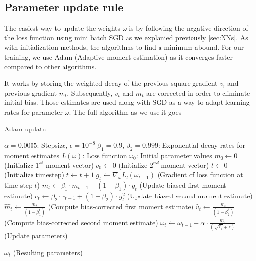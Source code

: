 \FloatBarrier

\subsection{Parameter update rule}     
The easiest way to update the weights $\omega$ is by following the negative direction of the loss function using mini batch SGD as we explanied previously \ref{sec:NNs}. As with initialization methods, the algorithms to find a minimum abound. For our training, we use Adam (Adaptive moment estimation) \cite{kingma2014adam} as it converges faster compared to other algorithms. \

It works by storing the weighted decay of the previous square gradient $v_t$ and previous gradient $m_t$. Subsequently, $v_t$ and $m_t$ are corrected in order to eliminate initial bias. Those estimates are used along with SGD as a way to adapt learning rates for parameter $\omega$. The full algorithm  as we use it goes     

\begin{algorithm}
\caption{Adam update}
\label{Adamalg}
\begin{algorithmic}[2]
    \Require $\alpha = 0.0005 $: Stepsize, $\epsilon = 10^{-8}$ 
    \Require $\beta_1 = 0.9$, $\beta_2 = 0.999$: Exponential decay rates for moment estimates
    \Require $L ( \omega ) $: Loss function
    \Require $ \omega_0 $: Initial parameter values
    \State $m_0 \leftarrow 0$ (Initialize $1^{st}$ moment vector)
    \State $v_0 \leftarrow 0$ (Initialize $2^{nd}$ moment vector)
    \State $t \leftarrow 0$ (Initialize timestep)
        \State $t \leftarrow t+1$ 
        \State $g_t \leftarrow \nabla_{\omega} L_t ( \omega_{t-1} )$ (Gradient of loss function at time step $t$)
        \State $m_t \leftarrow \beta_1 \cdot m_{t-1} + ( 1 -  \beta_1) \cdot g_t $ (Update biased first moment estimate)
        \State $v_t \leftarrow \beta_2 \cdot v_{t-1} + (1 - \beta_2) \cdot g_{t}^2 $ (Update biased second moment estimate)
        \State $\hat{m}_t \leftarrow \frac{m_t}{( 1 - \beta_{1}^{t} )}$  (Compute bias-corrected first moment estimate)
        \State $\hat{v}_t \leftarrow \frac{m_t}{( 1 - \beta_{2}^{t} )}$  (Compute bias-corrected second moment estimate)
        \State $\omega_t \leftarrow \omega_{t-1} - \alpha \cdot \frac{ \hat{m}_t }{ ( \sqrt{\hat{v}_t } + \epsilon ) } $ (Update parameters)

    \EndWhile
    
    \State \Return $\omega_t $ (Resulting parameters)   
\end{algorithmic}
\end{algorithm}

